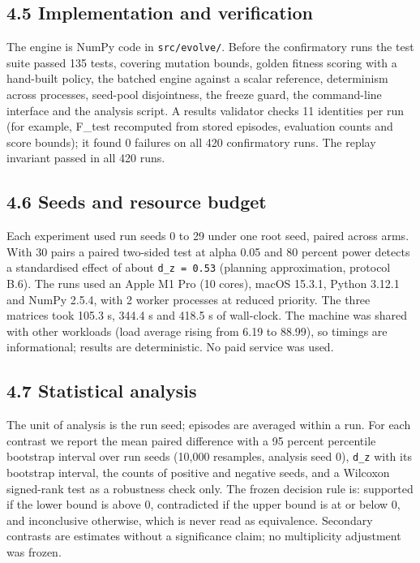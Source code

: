\documentclass[
]{article}
\begin{document}
\subsection{4.5 Implementation and
verification}\label{implementation-and-verification}

The engine is NumPy code in \texttt{src/evolve/}. Before the
confirmatory runs the test suite passed 135 tests, covering mutation
bounds, golden fitness scoring with a hand-built policy, the batched
engine against a scalar reference, determinism across processes,
seed-pool disjointness, the freeze guard, the command-line interface and
the analysis script. A results validator checks 11 identities per run
(for example, F\_test recomputed from stored episodes, evaluation counts
and score bounds); it found 0 failures on all 420 confirmatory runs. The
replay invariant passed in all 420 runs.

\subsection{4.6 Seeds and resource
budget}\label{seeds-and-resource-budget}

Each experiment used run seeds 0 to 29 under one root seed, paired
across arms. With 30 pairs a paired two-sided test at alpha 0.05 and 80
percent power detects a standardised effect of about
\texttt{d\_z\ =\ 0.53} (planning approximation, protocol B.6). The runs
used an Apple M1 Pro (10 cores), macOS 15.3.1, Python 3.12.1 and NumPy
2.5.4, with 2 worker processes at reduced priority. The three matrices
took 105.3 s, 344.4 s and 418.5 s of wall-clock. The machine was shared
with other workloads (load average rising from 6.19 to 88.99), so
timings are informational; results are deterministic. No paid service
was used.

\subsection{4.7 Statistical analysis}\label{statistical-analysis}

The unit of analysis is the run seed; episodes are averaged within a
run. For each contrast we report the mean paired difference with a 95
percent percentile bootstrap interval over run seeds (10,000 resamples,
analysis seed 0), \texttt{d\_z} with its bootstrap interval, the counts
of positive and negative seeds, and a Wilcoxon signed-rank test as a
robustness check only. The frozen decision rule is: supported if the
lower bound is above 0, contradicted if the upper bound is at or below
0, and inconclusive otherwise, which is never read as equivalence.
Secondary contrasts are estimates without a significance claim; no
multiplicity adjustment was frozen.
\end{document}
